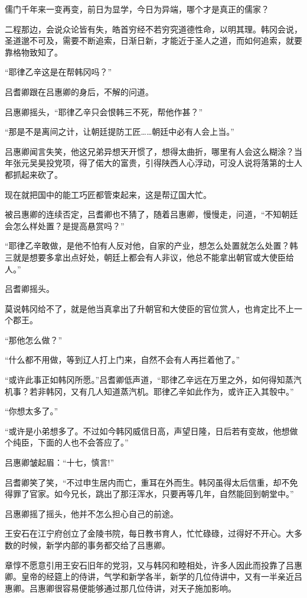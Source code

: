 儒门千年来一变再变，前日为显学，今日为异端，哪个才是真正的儒家？

二程那边，会说众论皆有失，皓首穷经不若穷究道德性命，以明其理。韩冈会说，圣道邈不可及，需要不断追索，日渐日新，才能近于圣人之道，而如何追索，就要靠格物致知了。

“耶律乙辛这是在帮韩冈吗？”

吕耆卿跟在吕惠卿的身后，不解的问道。

吕惠卿摇头，“耶律乙辛只会恨韩三不死，帮他作甚？”

“那是不是离间之计，让朝廷提防工匠……朝廷中必有人会上当。”

吕惠卿闻言失笑，他这兄弟异想天开惯了，想得太曲折，哪里有人会这么糊涂？当年张元吴昊投党项，得了偌大的富贵，引得陕西人心浮动，可没人说将落第的士人都抓起来砍了。

现在就把国中的能工巧匠都管束起来，这是帮辽国大忙。

被吕惠卿的连续否定，吕耆卿也不猜了，随着吕惠卿，慢慢走，问道，“不知朝廷会怎么样处置？是提高悬赏吗？”

“耶律乙辛敢做，是他不怕有人反对他，自家的产业，想怎么处置就怎么处置？韩三就是想要多拿出点好处，朝廷上都会有人非议，他总不能拿出朝官或大使臣给人。”

吕耆卿摇头。

莫说韩冈给不了，就是他当真拿出了升朝官和大使臣的官位赏人，也肯定比不上一个郡王。

“那他怎么做？”

“什么都不用做，等到辽人打上门来，自然不会有人再拦着他了。”

“或许此事正如韩冈所愿。”吕耆卿低声道，“耶律乙辛远在万里之外，如何得知蒸汽机事？若非韩冈，又有几人知道蒸汽机。耶律乙辛如此作为，或许正入其彀中。”

“你想太多了。”

“或许是小弟想多了。不过如今韩冈威信日高，声望日隆，日后若有变故，他想做个纯臣，下面的人也不会答应了。”

吕惠卿皱起眉：“十七，慎言!”

吕耆卿笑了笑，“不过申生居内而亡，重耳在外而生。韩冈虽得太后信重，却不免得罪了官家。如今兄长，跳出了那汪浑水，只要再等几年，自然能回到朝堂中。”

吕惠卿摇了摇头，他并不怎么担心自己的前途。

王安石在江宁府创立了金陵书院，每日教书育人，忙忙碌碌，过得好不开心。大多数的时候，新学内部的事务都交给了吕惠卿。

章惇不愿意引用王安石旧年的党羽，又与韩冈和睦相处，许多人因此而投靠了吕惠卿。皇帝的经筵上的侍讲，气学和新学各半，新学的几位侍讲中，又有一半亲近吕惠卿。吕惠卿很容易便能够通过那几位侍讲，对天子施加影响。

